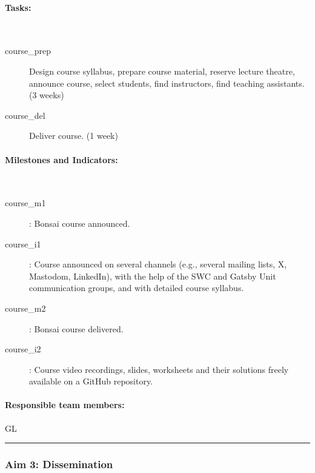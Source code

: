 \paragraph{Tasks:}\mbox{}\\

\begin{description}

    \item[course\_prep] Design course syllabus, prepare course material,
    reserve lecture theatre, announce course, select students, find instructors, find teaching
    assistants. (3 weeks)

    \item[course\_del] Deliver course. (1 week)

\end{description}

\paragraph{Milestones and Indicators:}\mbox{}\\

\begin{description}

    \item[course\_m1]: Bonsai course announced.

    \item[course\_i1]: Course announced on several channels (e.g., several
    mailing lists, X, Mastodom, LinkedIn), with the help of the SWC and Gatsby
    Unit communication groups, and with detailed course syllabus.

    \item[course\_m2]: Bonsai course delivered.

    \item[course\_i2]: Course video recordings, slides, worksheets and their
        solutions freely available on a GitHub repository.

\end{description}

\paragraph{Responsible team members:} GL

\noindent\rule{\textwidth}{1pt}
\subsubsection{Aim 3: Dissemination}


